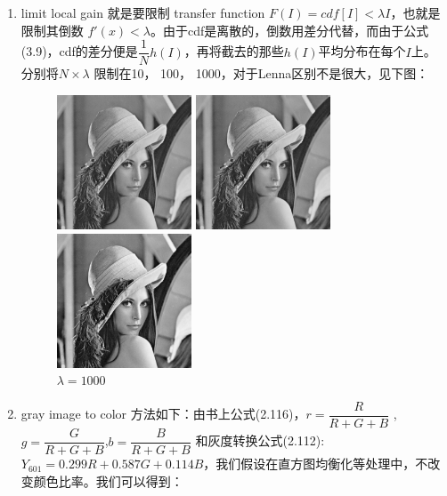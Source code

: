 \documentclass[a4paper,UTF8]{article}
\numberwithin{equation}{section}
\begin{document}
\begin{enumerate}[(\romannumeral1)]
	\item limit local gain 就是要限制 transfer function $F(I) = cdf[I] < \lambda I$，也就是限制其倒数 $f'(x)<\lambda $。由于cdf是离散的，倒数用差分代替，而由于公式(3.9)，cdf的差分便是$\dfrac{1}{N}h(I)$，再将截去的那些$h(I)$平均分布在每个$I$上。 分别将$N×\lambda $ 限制在10， 100， 1000，对于Lenna区别不是很大，见下图：
\begin{figure}[htbp]
\centering
\begin{minipage}[t]{0.30\textwidth}
\centering
\includegraphics[width=4cm]{Lenna_limit_10.png}
\caption{$\lambda=10$}
\label{Lenna:10_lambda}
\end{minipage}
\centering
\begin{minipage}[t]{0.30\textwidth}
\centering
\includegraphics[width=4cm]{Lenna_limit_100.png}
\caption{$\lambda=100$}
\label{Lenna:100_lambda}
\end{minipage}
\centering
\begin{minipage}[t]{0.30\textwidth}
\centering
\includegraphics[width=4cm]{Lenna_limit_1000.png}
\caption{$\lambda=1000$}
\label{Lenna:1000_lambda}
\end{minipage}
\end{figure}
	\item gray image to color 方法如下：由书上公式(2.116)，$r=\dfrac{R}{R+G+B}$ ,$g=\dfrac{G}{R+G+B}$,$b=\dfrac{B}{R+G+B}$ 和灰度转换公式(2.112):$Y_{601}=0.299R+0.587G+0.114B$，我们假设在直方图均衡化等处理中，不改变颜色比率。我们可以得到：

\end{enumerate}
\end{document}
